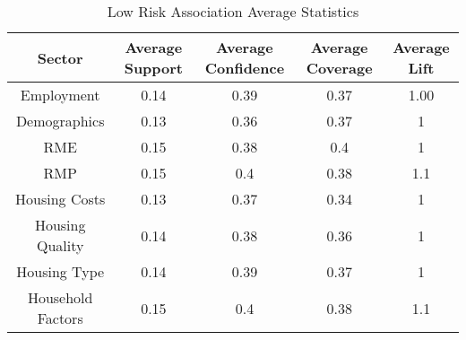 \begin{table}[h]
    \centering
    \caption{Low Risk Association Average Statistics}
    \label{tab:low_risk_ass} %
    \begin{tabular}{|c|c|c|c|c|}
    \hline
    Sector & Average Support & Average Confidence & Average Coverage & Average Lift \\
    \hline
    Employment & 0.14 & 0.39 & 0.37 & 1.00 \\
    \hline
    Demographics & 0.13 & 0.36 & 0.37 & 1 \\
    \hline
    RME & 0.15 & 0.38 & 0.4 & 1 \\
    \hline
    RMP & 0.15 & 0.4 & 0.38 & 1.1 \\
    \hline
    Housing Costs & 0.13 & 0.37 & 0.34 & 1 \\
    \hline
    Housing Quality & 0.14 & 0.38 & 0.36 & 1 \\
    \hline
    Housing Type & 0.14 & 0.39 & 0.37 & 1 \\
    \hline
    Household Factors & 0.15 & 0.4 & 0.38 & 1.1 \\
    \hline
    \end{tabular}
\end{table}